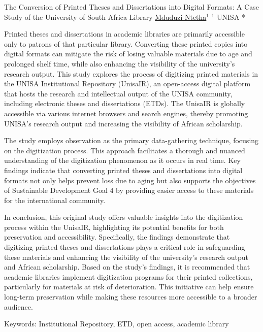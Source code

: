 
    \begin{abstract_online}{The Conversion of Printed Theses and Dissertations into Digital Formats: A Case Study of the University of South Africa Library}{%
    \underline{Mduduzi Ntetha}$^{1}$}{%
    }{%
    $^1$ UNISA *\newline{}
}

Printed theses and dissertations in academic libraries are primarily accessible only to patrons of that particular library. Converting these printed copies into digital formats can mitigate the risk of losing valuable materials due to age and prolonged shelf time, while also enhancing the visibility of the university's research output. This study explores the process of digitizing printed materials in the UNISA Institutional Repository (UnisaIR), an open-access digital platform that hosts the research and intellectual output of the UNISA community, including electronic theses and dissertations (ETDs). The UnisaIR is globally accessible via various internet browsers and search engines, thereby promoting UNISA’s research output and increasing the visibility of African scholarship.

The study employs observation as the primary data-gathering technique, focusing on the digitization process. This approach facilitates a thorough and nuanced understanding of the digitization phenomenon as it occurs in real time. Key findings indicate that converting printed theses and dissertations into digital formats not only helps prevent loss due to aging but also supports the objectives of Sustainable Development Goal 4 by providing easier access to these materials for the international community.

In conclusion, this original study offers valuable insights into the digitization process within the UnisaIR, highlighting its potential benefits for both preservation and accessibility. Specifically, the findings demonstrate that digitizing printed theses and dissertations plays a critical role in safeguarding these materials and enhancing the visibility of the university's research output and African scholarship. Based on the study's findings, it is recommended that academic libraries implement digitization programs for their printed collections, particularly for materials at risk of deterioration. This initiative can help ensure long-term preservation while making these resources more accessible to a broader audience.

Keywords: Institutional Repository, ETD, open access, academic library
\end{abstract_online}

